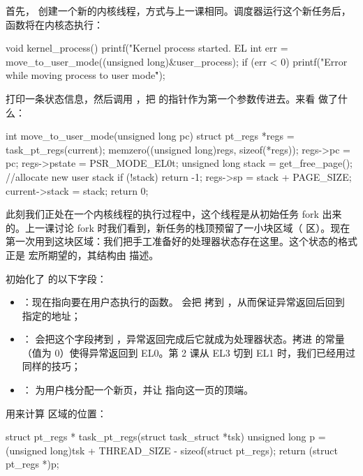 首先， 创建一个新的内核线程，方式与上一课相同。调度器运行这个新任务后， 函数将在内核态执行：

\begin{ccode}
void kernel_process(){
	printf("Kernel process started. EL %
	int err = move_to_user_mode((unsigned long)&user_process);
	if (err < 0){
		printf("Error while moving process to user mode\n\r");
	}
}
\end{ccode}

 打印一条状态信息，然后调用 ，把  的指针作为第一个参数传进去。来看  做了什么：

\begin{ccode}
int move_to_user_mode(unsigned long pc)
{
	struct pt_regs *regs = task_pt_regs(current);
	memzero((unsigned long)regs, sizeof(*regs));
	regs->pc = pc;
	regs->pstate = PSR_MODE_EL0t;
	unsigned long stack = get_free_page(); //allocate new user stack
	if (!stack) {
		return -1;
	}
	regs->sp = stack + PAGE_SIZE;
	current->stack = stack;
	return 0;
}
\end{ccode}

此刻我们正处在一个内核线程的执行过程中，这个线程是从初始任务 fork 出来的。上一课讨论 fork 时我们看到，新任务的栈顶预留了一小块区域（ 区）。现在第一次用到这块区域：我们把手工准备好的处理器状态存在这里。这个状态的格式正是  宏所期望的，其结构由  描述。

 初始化了  的以下字段：

\begin{itemize}
  \item {}：现在指向要在用户态执行的函数。 会把  拷到 ，从而保证异常返回后回到  指定的地址；
  \item {}： 会把这个字段拷到 ，异常返回完成后它就成为处理器状态。拷进  的常量 （值为 0）使得异常返回到 EL0。第 2 课从 EL3 切到 EL1 时，我们已经用过同样的技巧；
  \item {}： 为用户栈分配一个新页，并让  指向这一页的顶端。
\end{itemize}

 用来计算  区域的位置：

\begin{ccode}
struct pt_regs * task_pt_regs(struct task_struct *tsk){
	unsigned long p = (unsigned long)tsk + THREAD_SIZE - sizeof(struct pt_regs);
	return (struct pt_regs *)p;
}
\end{ccode}

